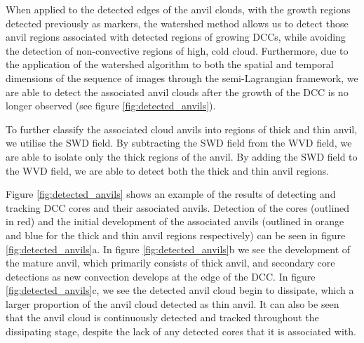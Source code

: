 \documentclass[amt, manuscript]{copernicus}
\begin{document}
When applied to the detected edges of the anvil clouds, with the growth regions detected previously as markers, the watershed method allows us to detect those anvil regions associated with detected regions of growing DCCs, while avoiding the detection of non-convective regions of high, cold cloud.
Furthermore, due to the application of the watershed algorithm to both the spatial and temporal dimensions of the sequence of images through the semi-Lagrangian framework, we are able to detect the associated anvil clouds after the growth of the DCC is no longer observed (see figure \ref{fig:detected_anvils}).

To further classify the associated cloud anvils into regions of thick and thin anvil, we utilise the SWD field.
By subtracting the SWD field from the WVD field, we are able to isolate only the thick regions of the anvil.
By adding the SWD field to the WVD field, we are able to detect both the thick and thin anvil regions.

Figure \ref{fig:detected_anvils} shows an example of the results of detecting and tracking DCC cores and their associated anvils.
Detection of the cores (outlined in red) and the initial development of the associated anvils (outlined in orange and blue for the thick and thin anvil regions respectively) can be seen in figure \ref{fig:detected_anvils}a.
In figure \ref{fig:detected_anvils}b we see the development of the mature anvil, which primarily consists of thick anvil, and secondary core detections as new convection develops at the edge of the DCC.
In figure \ref{fig:detected_anvils}c, we see the detected anvil cloud begin to dissipate, which a larger proportion of the anvil cloud detected as thin anvil.
It can also be seen that the anvil cloud is continuously detected and tracked throughout the dissipating stage, despite the lack of any detected cores that it is associated with.

\end{document}
